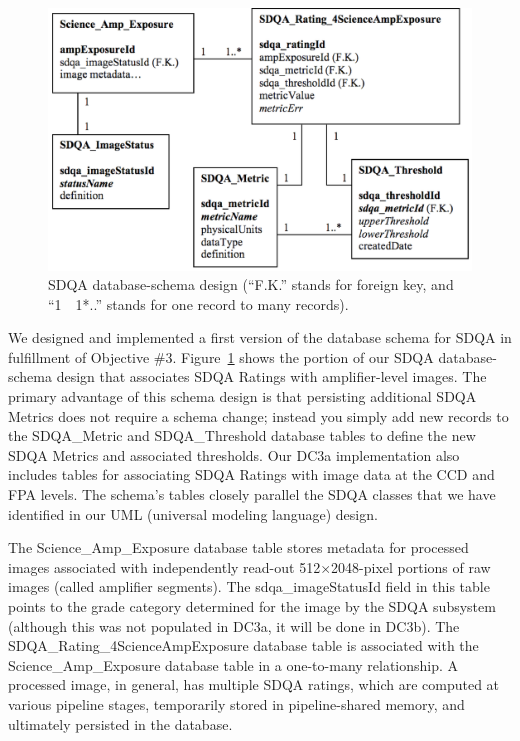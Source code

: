 \begin{figure}[tbh]
\begin{centering}
\includegraphics[scale=0.4]{images/O7A2_1}
\caption{SDQA database-schema design (``F.K.'' stands for foreign key, and ``1~{\jot 24pt}~1*..'' stands for one record to many records).} 
 \label{DB}
\end{centering}
\end{figure}

We designed and implemented a first version of the database schema for SDQA in fulfillment
of Objective \#3.  Figure~\ref{DB} shows the portion of our SDQA database-schema design
that associates SDQA Ratings with amplifier-level images.  
The primary advantage of this schema design is that persisting additional SDQA Metrics
does not require a schema change; instead you simply add new records to the SDQA\_Metric
and SDQA\_Threshold database tables to define the new SDQA Metrics and associated thresholds.
Our DC3a implementation also
includes tables for associating SDQA Ratings with image data at the CCD and FPA levels.
The schema's tables closely parallel the SDQA classes that we have identified in our UML (universal modeling language) design.

The Science\_Amp\_Exposure database table stores metadata for
processed images associated with independently read-out 
512$\times$2048-pixel portions of 
raw images (called amplifier 
segments).  The sdqa\_imageStatusId field in this table points to the grade
category determined for the image by the SDQA subsystem (although this was not populated
in DC3a, it will be done in DC3b).  
The SDQA\_Rating\_4ScienceAmpExposure database table is associated with 
the Science\_Amp\_Exposure database table in a one-to-many
relationship.  A processed image, in general, has multiple SDQA ratings, which
are computed at various pipeline stages, temporarily stored in pipeline-shared memory, and 
ultimately persisted in the database.


